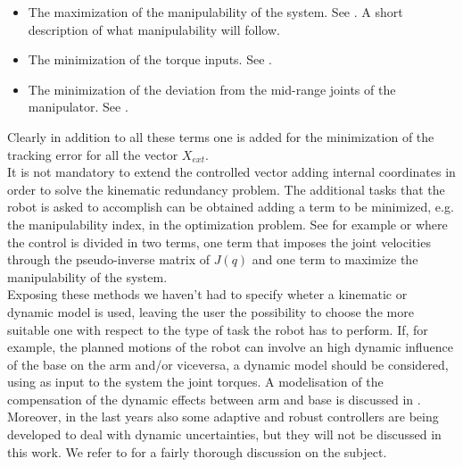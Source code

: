 \begin{itemize}
	\item The maximization of the manipulability of the system. See \cite{yamamoto}. A short description of what manipulability will follow.
	\item The minimization of the torque inputs. See \cite{chen1997dynamic}.
	\item The minimization of the deviation from the mid-range joints of the manipulator. See \cite{khatib1999}.
\end{itemize}
Clearly in addition to all these terms one is added for the minimization of the tracking error for all the vector $X_{ext}$.\\
It is not mandatory to extend the controlled vector adding internal coordinates in order to solve the kinematic redundancy problem. The additional tasks that the robot is asked to accomplish can be obtained adding a term to be minimized, e.g. the manipulability index, in the optimization problem. See for example \cite{bayle1} or \cite{bayle2} where the control is divided in two terms, one term that imposes the joint velocities  through the pseudo-inverse matrix of $J(q)$ and one term to maximize the manipulability of the system.\\
Exposing these methods we haven't had to specify wheter a kinematic or dynamic model is used, leaving the user the possibility to choose the more suitable one with respect to the type of task the robot has to perform. If, for example, the planned motions of the robot can involve an high dynamic influence of the base on the arm and/or viceversa, a dynamic model should be considered, using as input to the system the joint torques. A modelisation of the compensation of the dynamic effects between arm and base is discussed in \cite{yamamoto1}.
Moreover, in the last years also some adaptive and robust controllers are being developed to deal with dynamic uncertainties, but they will not be discussed in this work. We refer to \cite{libromobilemanipulators} for a fairly thorough discussion on the subject.

